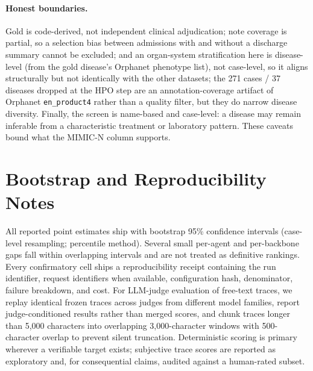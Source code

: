 \documentclass[letterpaper]{article} %
\begin{document}
\paragraph{Honest boundaries.}
Gold is code-derived, not independent clinical adjudication; note coverage is
partial, so a selection bias between admissions with and without a discharge
summary cannot be excluded; and an organ-system stratification here is
disease-level (from the gold disease's Orphanet phenotype list), not
case-level, so it aligns structurally but not identically with the other
datasets; the 271 cases / 37 diseases dropped at the HPO step are an
annotation-coverage artifact of Orphanet \texttt{en\_product4} rather than a
quality filter, but they do narrow disease diversity. Finally, the screen is
name-based and case-level: a disease may remain inferable from a characteristic
treatment or laboratory pattern. These caveats bound what the MIMIC-N column
supports.

\section{Bootstrap and Reproducibility Notes}
\label{app:repro-notes}

All reported point estimates ship with bootstrap 95\% confidence intervals
(case-level resampling; percentile method). Several small per-agent and
per-backbone gaps fall within overlapping intervals and are not treated as
definitive rankings. Every confirmatory cell ships a reproducibility receipt
containing the run identifier, request identifiers when available, configuration
hash, denominator, failure breakdown, and cost. For LLM-judge evaluation of
free-text traces, we replay identical frozen traces across judges from different
model families, report judge-conditioned results rather than merged scores, and
chunk traces longer than 5,000 characters into overlapping 3,000-character
windows with 500-character overlap to prevent silent truncation. Deterministic
scoring is primary wherever a verifiable target exists; subjective trace scores
are reported as exploratory and, for consequential claims, audited against a
human-rated subset.
\end{document}
